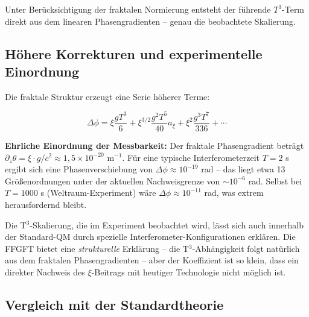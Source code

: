 	Unter Berücksichtigung der fraktalen Normierung entsteht der führende \(T^3\)-Term direkt aus dem linearen Phasengradienten -- genau die beobachtete Skalierung.
	
	\subsection*{Höhere Korrekturen und experimentelle Einordnung}
	
	Die fraktale Struktur erzeugt eine Serie höherer Terme:
	
	\begin{equation}
		\Delta \phi = \xi \frac{g T^3}{6} + \xi^{3/2} \frac{g^2 T^5}{40} a_\xi + \xi^2 \frac{g^3 T^7}{336} + \cdots
	\end{equation}
	
	\textbf{Ehrliche Einordnung der Messbarkeit:} Der fraktale Phasengradient beträgt \(\partial_z \theta = \xi \cdot g/c^2 \approx 1{,}5 \times 10^{-20}\) m\(^{-1}\). Für eine typische Interferometerzeit \(T = 2\) s ergibt sich eine Phasenverschiebung von \(\Delta\phi \approx 10^{-19}\) rad -- das liegt etwa 13 Größenordnungen unter der aktuellen Nachweisgrenze von \(\sim 10^{-6}\) rad. Selbst bei \(T = 1000\) s (Weltraum-Experiment) wäre \(\Delta\phi \approx 10^{-11}\) rad, was extrem herausfordernd bleibt.
	
	Die T\(^3\)-Skalierung, die im Experiment beobachtet wird, lässt sich auch innerhalb der Standard-QM durch spezielle Interferometer-Konfigurationen erklären. Die FFGFT bietet eine \textit{strukturelle} Erklärung -- die T\(^3\)-Abhängigkeit folgt natürlich aus dem fraktalen Phasengradienten -- aber der Koeffizient ist so klein, dass ein direkter Nachweis des \(\xi\)-Beitrags mit heutiger Technologie nicht möglich ist.
	
	\subsection*{Vergleich mit der Standardtheorie}
	
	\begin{center}
		\small
	\end{center}
	
